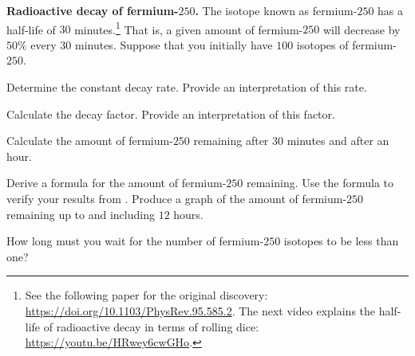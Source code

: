 \documentclass[a4paper,oneside,12pt]{article}
\begin{document}
\begin{exercise}
\textbf{Radioactive decay of fermium-$250$.}
The isotope known as fermium-$250$ has a half-life of $30$
minutes.\footnote{
  See the following paper for the original discovery:
  \url{https://doi.org/10.1103/PhysRev.95.585.2}.  The next video
  explains the half-life of radioactive decay in terms of rolling
  dice:
  \url{https://youtu.be/HRwey6cwGHo}.
}
That is, a given amount of fermium-$250$ will decrease by $50\%$ every
$30$ minutes.  Suppose that you initially have $100$ isotopes of
fermium-$250$.
\begin{packedenum}
\item\label{subex:fermium250_decay_rate}
  Determine the constant decay rate.  Provide an interpretation of
  this rate.

\item\label{subex:fermium250_decay_factor}
  Calculate the decay factor.  Provide an interpretation of this
  factor.

\item\label{subex:fermium250_30minutes_60minutes}
  Calculate the amount of fermium-$250$ remaining after $30$ minutes
  and after an hour.

\item\label{subex:fermium250_decay_formula}
  Derive a formula for the amount of fermium-$250$ remaining.  Use the
  formula to verify your results
  from .  Produce a graph
  of the amount of fermium-$250$ remaining up to and including $12$
  hours.

\item\label{subex:fermium250_less_than_1microgram}
  How long must you wait for the number of fermium-$250$ isotopes to
  be less than one?
\end{packedenum}
\end{exercise}
\end{document}
